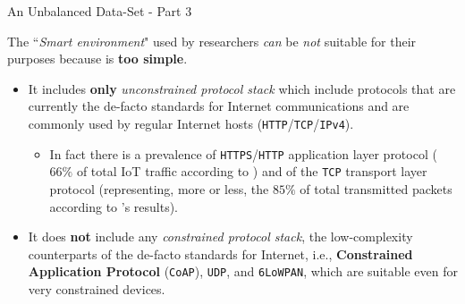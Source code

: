 \documentclass[10pt]{beamer}
\begin{document}
\begin{frame}{An Unbalanced Data-Set - Part 3}

\begin{block}{}
\justifying

The ``\textit{Smart environment}" used by researchers \textit{can} be \textit{not} suitable for their purposes because is \textbf{too simple}.

\begin{itemize}
\justifying

\item It includes \textbf{only} \textit{unconstrained protocol stack} which include protocols that are currently the de-facto standards for Internet communications and are commonly used by regular Internet hosts (\texttt{HTTP}/\texttt{TCP}/\texttt{IPv4}).

\begin{itemize}
\justifying
\item In fact there is a prevalence of \texttt{HTTPS}/\texttt{HTTP} application layer protocol ($66\%$ of total IoT traffic according to \citet{ITPAReport}) and of the \texttt{TCP} transport layer protocol (representing, more or less, the $85\%$ of total transmitted packets according to \citet{ITPAReport}'s results).
\end{itemize}

\item It does \textbf{not} include any \textit{constrained protocol stack}, the low-complexity counterparts of the de-facto standards for Internet, i.e., \textbf{Constrained Application Protocol} (\texttt{CoAP}), \texttt{UDP}, and \texttt{6LoWPAN}, which are suitable even for very constrained devices.

\end{itemize}

\end{block}


\end{frame} 
\end{document}
